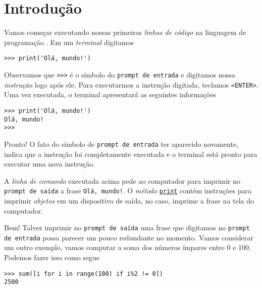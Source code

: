 
\chapter{Introdução}\label{cap_intro}
\thispagestyle{fancy}

Vamos começar executando nossas primeiras \emph{linhas de código} na linguagem de programação {\python}. Em um \emph{terminal} {\python} digitamos

\begin{lstlisting}
>>> print('Olá, mundo!')
\end{lstlisting}

Observamos que \lstinline+>>>+ é o símbolo do \lstinline+prompt de entrada+ e digitamos nossa \emph{instrução} logo após ele. Para executarmos a instrução digitada, teclamos \lstinline+<ENTER>+. Uma vez executada, o terminal apresentará as seguintes informações

\begin{lstlisting}
>>> print('Olá, mundo!')
Olá, mundo!
>>> 
\end{lstlisting}

Pronto! O fato do símbolo de \lstinline+prompt de entrada+ ter aparecido novamente, indica que a instrução foi completamente executada e o terminal está pronto para executar uma nova instrução.

A \emph{linha de comando} executada acima pede ao computador para imprimir no \lstinline+prompt de saída+ a frase \lstinline+Olá, mundo!+. O \emph{método} \href{https://docs.python.org/3/library/functions.html}{\lstinline+print+} contém instruções para imprimir \emph{objetos} em um dispositivo de saída, no caso, imprime a frase na tela do computador.

Bem! Talvez imprimir no \lstinline+prompt de saída+ uma frase que digitamos no \lstinline+prompt de entrada+ possa parecer um pouco redundante no momento. Vamos considerar um outro exemplo, vamos computar a soma dos números ímpares entre $0$ e $100$. Podemos fazer isso como segue

\begin{lstlisting}
>>> sum([i for i in range(100) if i%2 != 0])
2500
\end{lstlisting}

